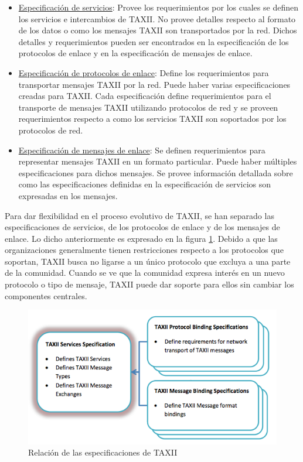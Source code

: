 \begin{itemize}
  \item \underline{Especificación de servicios}: Provee los requerimientos por los cuales se 
  definen los servicios e intercambios de TAXII. No provee detalles respecto al 
  formato de los datos o como los mensajes TAXII son transportados por la red. 
  Dichos detalles y requerimientos pueden ser encontrados en la especificación 
  de los protocolos de enlace y en la especificación de mensajes de enlace.
 \item \underline{Especificación de protocolos de enlace}: Define los requerimientos para 
 transportar mensajes TAXII por la red. Puede haber varias especificaciones 
 creadas para TAXII. Cada especificación define requerimientos para el 
 transporte de mensajes TAXII utilizando protocolos de red y se proveen 
 requerimientos respecto a como los servicios TAXII son soportados por los 
 protocolos de red.
 \item \underline{Especificación de mensajes de enlace}: Se definen requerimientos para 
 representar mensajes TAXII en un formato particular. Puede haber múltiples 
 especificaciones para dichos mensajes. Se provee información detallada sobre 
 como las especificaciones definidas en la especificación de servicios son 
 expresadas en los mensajes.
\end{itemize}

Para dar flexibilidad en el proceso evolutivo de TAXII, se han separado las 
especificaciones de servicios, de los protocolos de enlace y de los mensajes de 
enlace. Lo dicho anteriormente es expresado en la figura \ref{fig.taxii_rel_spec}.
Debido a que las organizaciones generalmente tienen restricciones 
respecto a los protocolos que soportan, TAXII busca no ligarse a un único 
protocolo que excluya a una parte de la comunidad. Cuando se ve que la comunidad 
expresa interés en un nuevo protocolo o tipo de mensaje, TAXII puede dar soporte 
para ellos sin cambiar los componentes centrales.\\

\begin{figure}[H]
	\centering
	\includegraphics[width=150mm]{./images/TAXIIEspecification.png}
	\caption{Relación de las especificaciones de TAXII \protect\cite{b1}}
	\label{fig.taxii_rel_spec}
\end{figure}

